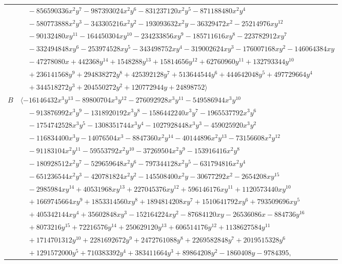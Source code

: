 \documentclass[11pt]{article}
\begin{document}
\begin{longtable}{@{}ll@{}}
 & $\quad -856590336x^{2}y^{7}-987393024x^{2}y^{6}-831237120x^{2}y^{5}-871188480x^{2}y^{4}$\\
 & $\quad -580773888x^{2}y^{3}-343305216x^{2}y^{2}-193093632x^{2}y-36329472x^{2}-25214976xy^{12}$\\
 & $\quad -90132480xy^{11}-164450304xy^{10}-234233856xy^{9}-185711616xy^{8}-223782912xy^{7}$\\
 & $\quad -332494848xy^{6}-253974528xy^{5}-343498752xy^{4}-319002624xy^{3}-176007168xy^{2}-146064384xy$\\
 & $\quad -47278080x+442368y^{14}+1548288y^{13}+15814656y^{12}+62760960y^{11}+132793344y^{10}$\\
 & $\quad +236141568y^{9}+294838272y^{8}+425392128y^{7}+513644544y^{6}+444642048y^{5}+497729664y^{4}$\\
 & $\quad +344518272y^{3}+204550272y^{2}+120772944y+24898752\rangle$\\
$B$ & $\langle -16146432x^{3}y^{13}-89800704x^{3}y^{12}-276092928x^{3}y^{11}-549586944x^{3}y^{10}$\\
 & $\quad -913876992x^{3}y^{9}-1318920192x^{3}y^{8}-1586442240x^{3}y^{7}-1965537792x^{3}y^{6}$\\
 & $\quad -1754742528x^{3}y^{5}-1308351744x^{3}y^{4}-1027928448x^{3}y^{3}-459025920x^{3}y^{2}$\\
 & $\quad -116834400x^{3}y-14076504x^{3}-8847360x^{2}y^{14}-40144896x^{2}y^{13}-73156608x^{2}y^{12}$\\
 & $\quad -91183104x^{2}y^{11}-59553792x^{2}y^{10}-37269504x^{2}y^{9}-153916416x^{2}y^{8}$\\
 & $\quad -180928512x^{2}y^{7}-529659648x^{2}y^{6}-797344128x^{2}y^{5}-631794816x^{2}y^{4}$\\
 & $\quad -651236544x^{2}y^{3}-420781824x^{2}y^{2}-145508400x^{2}y-30677292x^{2}-2654208xy^{15}$\\
 & $\quad -2985984xy^{14}+40531968xy^{13}+227045376xy^{12}+596146176xy^{11}+1120573440xy^{10}$\\
 & $\quad +1669745664xy^{9}+1853314560xy^{8}+1894814208xy^{7}+1510641792xy^{6}+793509696xy^{5}$\\
 & $\quad +405342144xy^{4}+35602848xy^{3}-152164224xy^{2}-87684120xy-26536086x-884736y^{16}$\\
 & $\quad +8073216y^{15}+72216576y^{14}+250629120y^{13}+606514176y^{12}+1138627584y^{11}$\\
 & $\quad +1714701312y^{10}+2281692672y^{9}+2472761088y^{8}+2269582848y^{7}+2019515328y^{6}$\\
 & $\quad +1291572000y^{5}+710383392y^{4}+383411664y^{3}+89864208y^{2}-1860408y-9784395,$\\

\end{longtable}
\end{document}
